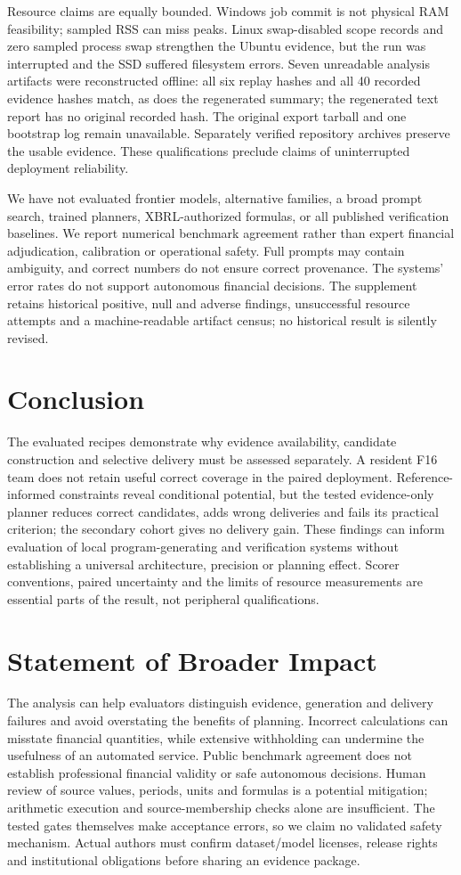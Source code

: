 \documentclass[10pt]{article}
\begin{document}
Resource claims are equally bounded. Windows job commit is not physical RAM feasibility; sampled RSS can miss peaks. Linux swap-disabled scope records and zero sampled process swap strengthen the Ubuntu evidence, but the run was interrupted and the SSD suffered filesystem errors. Seven unreadable analysis artifacts were reconstructed offline: all six replay hashes and all 40 recorded evidence hashes match, as does the regenerated summary; the regenerated text report has no original recorded hash. The original export tarball and one bootstrap log remain unavailable. Separately verified repository archives preserve the usable evidence. These qualifications preclude claims of uninterrupted deployment reliability.

We have not evaluated frontier models, alternative families, a broad prompt search, trained planners, XBRL-authorized formulas, or all published verification baselines. We report numerical benchmark agreement rather than expert financial adjudication, calibration or operational safety. Full prompts may contain ambiguity, and correct numbers do not ensure correct provenance. The systems' error rates do not support autonomous financial decisions. The supplement retains historical positive, null and adverse findings, unsuccessful resource attempts and a machine-readable artifact census; no historical result is silently revised.

\section{Conclusion}The evaluated recipes demonstrate why evidence availability, candidate construction and selective delivery must be assessed separately. A resident F16 team does not retain useful correct coverage in the paired deployment. Reference-informed constraints reveal conditional potential, but the tested evidence-only planner reduces correct candidates, adds wrong deliveries and fails its practical criterion; the secondary cohort gives no delivery gain. These findings can inform evaluation of local program-generating and verification systems without establishing a universal architecture, precision or planning effect. Scorer conventions, paired uncertainty and the limits of resource measurements are essential parts of the result, not peripheral qualifications.\label{main-content-end}
\section*{Statement of Broader Impact}
The analysis can help evaluators distinguish evidence, generation and delivery failures and avoid overstating the benefits of planning. Incorrect calculations can misstate financial quantities, while extensive withholding can undermine the usefulness of an automated service. Public benchmark agreement does not establish professional financial validity or safe autonomous decisions. Human review of source values, periods, units and formulas is a potential mitigation; arithmetic execution and source-membership checks alone are insufficient. The tested gates themselves make acceptance errors, so we claim no validated safety mechanism. Actual authors must confirm dataset/model licenses, release rights and institutional obligations before sharing an evidence package.
\end{document}
